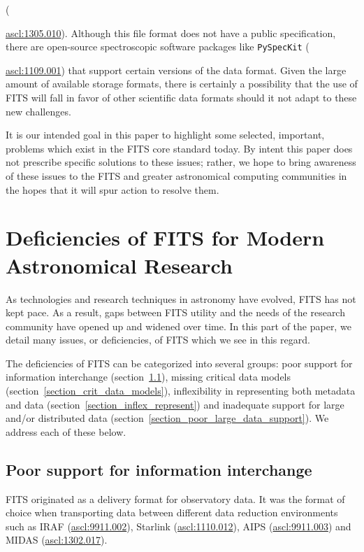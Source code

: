 \documentclass[final,authoryear,5p,times,twocolumn]{elsarticle}
\begin{document}
({\href{http://ascl.net/1305.010}{ascl:1305.010}). Although this file
format does not have a public specification,  there are open-source
spectroscopic software packages like \texttt{PySpecKit}
({\href{http://ascl.net/1109.001}{ascl:1109.001}) that support certain
versions of the data format.  Given the large amount of available
storage formats, there is certainly a possibility that the use of FITS
will fall in favor of other scientific data formats should it not adapt
to these new challenges.


It is our intended goal in this paper to highlight some selected,
important, problems which exist in the FITS core standard today.
By intent this paper does not prescribe specific solutions to these issues;
rather, we hope to bring awareness of these issues to the FITS and greater
astronomical computing communities in the hopes that
it will spur action to resolve them.

\section{Deficiencies of FITS for Modern Astronomical Research}
\label{section_deficiencies}

As technologies and research techniques in astronomy have evolved, FITS
has not kept pace. As a result, gaps between FITS utility and the
needs of the research community have opened up and widened over time. In
this part of the paper, we detail many issues, or deficiencies, of FITS
which we see in this regard.


The deficiencies of FITS can be categorized into several groups: poor 
support for information interchange
(section~\ref{section_poor_exchange}), missing critical data models
(section~\ref{section_crit_data_models}), inflexibility in representing
both metadata and data (section~\ref{section_inflex_represent}) and
inadequate support for large and/or distributed data
(section~\ref{section_poor_large_data_support}). We address each of
these below.

\subsection{Poor support for information interchange}
\label{section_poor_exchange}

FITS originated as a delivery format for observatory data. It was the format
of choice when transporting data between different data reduction
environments such as IRAF (\href{http://ascl.net/9911.002}{ascl:9911.002}),
Starlink (\href{http://ascl.net/1110.012}{ascl:1110.012}), AIPS
(\href{http://ascl.net/9911.003}{ascl:9911.003}) and MIDAS
(\href{http://ascl.net/1302.017}{ascl:1302.017}).


}}
\end{document}
